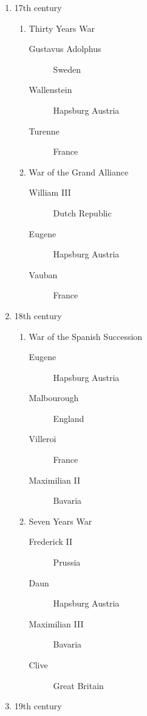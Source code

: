     \begin{enumerate}
        \item{17th century}
        \begin{enumerate}
            \item{Thirty Years War}
            \begin{description}
                \item[Gustavus Adolphus]{Sweden}
                \item[Wallenstein]{Hapsburg Austria}
                \item[Turenne]{France}
            \end{description}
        \item{War of the Grand Alliance}
            \begin{description}
                \item[William III]{Dutch Republic}
                \item[Eugene]{Hapsburg Austria}
                \item[Vauban]{France}
            \end{description}
        \end{enumerate}
        \item{18th century}
        \begin{enumerate}
            \item{War of the Spanish Succession}
            \begin{description}
                \item[Eugene]{Hapsburg Austria}
                \item[Malbourough]{England}
                \item[Villeroi]{France}
                \item[Maximilian II]{Bavaria}
            \end{description}
            \item{Seven Years War}
            \begin{description}
                \item[Frederick II]{Prussia}
                \item[Daun]{Hapsburg Austria}
                \item[Maximilian III]{Bavaria}
                \item[Clive]{Great Britain}
            \end{description}
        \end{enumerate}
        \item{19th century}

\end{enumerate}

